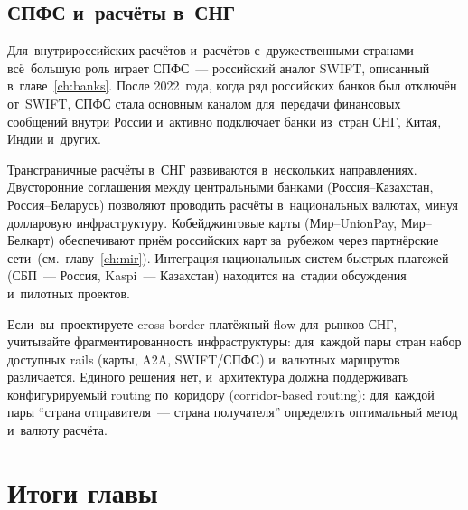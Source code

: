 \subsection*{СПФС и~расчёты в~СНГ}

Для~внутрироссийских расчётов и~расчётов с~дружественными
странами всё~большую роль играет СПФС~--- российский аналог
SWIFT, описанный в~главе~\ref{ch:banks}. После 2022~года,
когда ряд российских банков был отключён от~SWIFT, СПФС стала
основным каналом для~передачи финансовых сообщений внутри
России и~активно подключает банки из~стран СНГ, Китая, Индии
и~других.

Трансграничные расчёты в~СНГ развиваются в~нескольких
направлениях. Двусторонние соглашения между центральными
банками (Россия--Казахстан, Россия--Беларусь) позволяют
проводить расчёты в~национальных валютах, минуя долларовую
инфраструктуру. Кобейджинговые карты (Мир--UnionPay,
Мир--Белкарт) обеспечивают приём российских карт за~рубежом
через партнёрские сети~(см.~главу~\ref{ch:mir}). Интеграция
национальных систем быстрых платежей (СБП~--- Россия,
Kaspi~--- Казахстан) находится на~стадии обсуждения
и~пилотных проектов.

\begin{practice}
  Если~вы~проектируете cross-border платёжный flow
  для~рынков СНГ, учитывайте фрагментированность
  инфраструктуры: для~каждой пары стран набор доступных
  rails (карты, A2A, SWIFT/СПФС) и~валютных маршрутов
  различается. Единого решения нет, и~архитектура должна
  поддерживать конфигурируемый routing по~коридору
  (corridor-based routing): для~каждой пары
  \enquote{страна отправителя~--- страна получателя}
  определять оптимальный метод и~валюту расчёта.
\end{practice}


\section*{Итоги главы}


